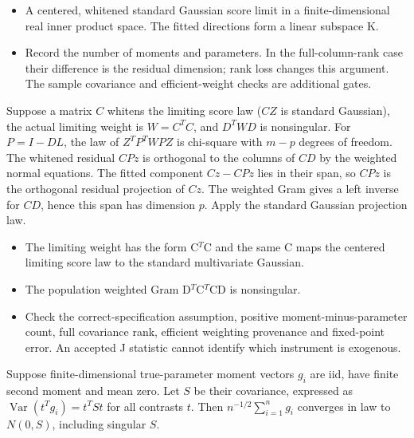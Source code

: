 \expandafter\def\csname statadic@assumptions@STATADIC-JTEST-002\endcsname{\begin{itemize}
\item A centered, whitened standard Gaussian score limit in a finite-dimensional real inner product space. The fitted directions form a linear subspace K.
\end{itemize}}
\expandafter\def\csname statadic@diagnostics@STATADIC-JTEST-002\endcsname{\begin{itemize}
\item Record the number of moments and parameters. In the full-column-rank case their difference is the residual dimension; rank loss changes this argument. The sample covariance and efficient-weight checks are additional gates.
\end{itemize}}
\expandafter\def\csname statadic@statement@STATADIC-JTEST-003\endcsname{Suppose a matrix $C$ whitens the limiting score law
  ($CZ$ is standard Gaussian), the actual limiting weight is $W=C^T C$,
  and $D^T W D$ is nonsingular. For $P=I-DL$, the law of
  $Z^T P^T W P Z$ is chi-square with $m-p$ degrees of freedom.}
\expandafter\def\csname statadic@proof@STATADIC-JTEST-003\endcsname{The whitened residual $CPz$ is orthogonal to the columns of
  $CD$ by the weighted normal equations. The fitted component $Cz-CPz$
  lies in their span, so $CPz$ is the orthogonal residual projection of
  $Cz$. The weighted Gram gives a left inverse for $CD$, hence this span
  has dimension $p$. Apply the standard Gaussian projection law.}
\expandafter\def\csname statadic@assumptions@STATADIC-JTEST-003\endcsname{\begin{itemize}
\item The limiting weight has the form C\ensuremath{{}^T}C and the same C maps the centered limiting score law to the standard multivariate Gaussian.
\item The population weighted Gram D\ensuremath{{}^T}C\ensuremath{{}^T}CD is nonsingular.
\end{itemize}}
\expandafter\def\csname statadic@diagnostics@STATADIC-JTEST-003\endcsname{\begin{itemize}
\item Check the correct-specification assumption, positive moment-minus-parameter count, full covariance rank, efficient weighting provenance and fixed-point error. An accepted J statistic cannot identify which instrument is exogenous.
\end{itemize}}
\expandafter\def\csname statadic@statement@STATADIC-GMM-011\endcsname{Suppose finite-dimensional true-parameter moment vectors
  $g_i$ are iid, have finite second moment and mean zero. Let $S$ be their
  covariance, expressed as $\operatorname{Var}(t^Tg_i)=t^T S t$ for all
  contrasts $t$. Then $n^{-1/2}\sum_{i=1}^n g_i$ converges in law to
  $N(0,S)$, including singular $S$.}
